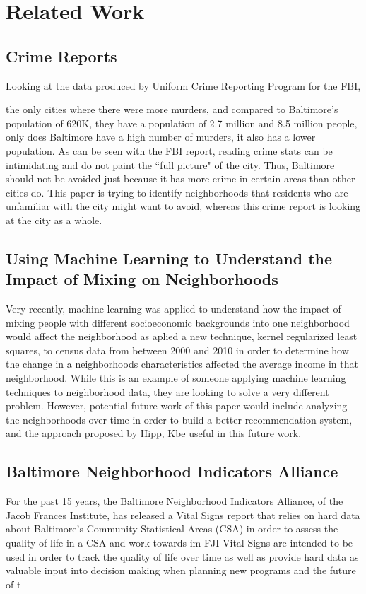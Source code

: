 \documentclass[conference]{IEEEtran}
\begin{document}
\section{Related Work}
\subsection{Crime Reports}
Looking at the data produced by Uniform Crime Reporting Program for the FBI,

the only cities where there were more murders, and compared to Baltimore's population of 620K,
they have a population of 2.7 million and 8.5 million people,  only does Baltimore
have a high number of murders, it also has a lower population.
As can be seen with the FBI report, reading crime stats can be intimidating and do not paint the ``full picture" of the city.  Thus,
Baltimore should not be avoided just because it has more crime in certain areas than other cities do.  This paper is
trying to identify neighborhoods that residents who are unfamiliar with the city might want to avoid, whereas this crime
report is looking at the city as a whole.

\subsection{Using Machine Learning to Understand the Impact of Mixing on Neighborhoods}
Very recently, machine learning was applied to understand how the impact of mixing people with different socioeconomic
backgrounds into one neighborhood would affect the neighborhood as aplied a new technique,
kernel regularized least squares, to census data from between 2000 and 2010 in order to determine how the change in a neighborhoods
characteristics affected the average income in that neighborhood.  While this is an example of someone applying machine learning
techniques to neighborhood data, they are looking to solve a very different problem.  However, potential future work of
this paper would include analyzing the neighborhoods over time in order to build a better recommendation system, and the
approach proposed by Hipp, Kbe useful in this future work.

\subsection{Baltimore Neighborhood Indicators Alliance}
For the past 15 years, the Baltimore Neighborhood Indicators Alliance, of the Jacob Frances Institute, has released a
Vital Signs report that relies on hard data about Baltimore’s Community Statistical Areas (CSA) in order to assess the quality
of life in a CSA and work towards im-FJI Vital Signs are intended to be used in
order to track the quality of life over time as well as provide hard data as valuable input into decision making when planning new
programs and the future of t
\end{document}

